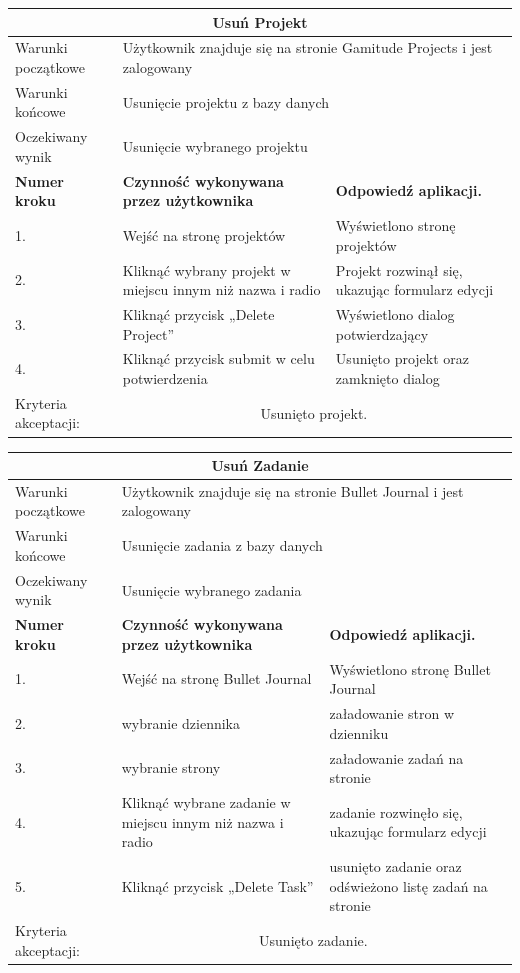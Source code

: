 \documentclass[a4paper,11pt]{report}
\begin{document}
\begin{table}[H]
	\centering
	\begin{tabular}{|p{2cm}|p{6cm}|p{6cm}|}
	\hline
	\multicolumn{3}{|c|}{\textbf{Usuń Projekt}}\\
	\hline
	Warunki początkowe & \multicolumn{2}{|p{12cm}|}{Użytkownik znajduje się na stronie Gamitude Projects i jest zalogowany}\\
	\hline
	Warunki końcowe & \multicolumn{2}{|p{12cm}|}{Usunięcie projektu z bazy danych}\\
	\hline
	Oczekiwany wynik & \multicolumn{2}{|p{12cm}|}{Usunięcie wybranego projektu}\\
	\hline
	\textbf{Numer kroku} & \textbf{Czynność wykonywana przez użytkownika} & \textbf{Odpowiedź aplikacji.} \\
	\hline
	1. & Wejść na stronę projektów & Wyświetlono stronę projektów \\
	\hline
	2. & Kliknąć wybrany projekt w miejscu innym niż nazwa i radio & Projekt rozwinął się, ukazując formularz edycji \\
	\hline
	3. & Kliknąć przycisk „Delete Project” & Wyświetlono dialog potwierdzający \\
	\hline
	4. & Kliknąć przycisk submit w celu potwierdzenia & Usunięto projekt oraz zamknięto dialog \\
	\hline
	Kryteria akceptacji: & \multicolumn{2}{|c|}{Usunięto projekt.} \\
	\hline
	\end{tabular}
\end{table}
\begin{table}[H]
	\centering
	\begin{tabular}{|p{2cm}|p{6cm}|p{6cm}|}
	\hline
	\multicolumn{3}{|c|}{\textbf{Usuń Zadanie}}\\
	\hline
	Warunki początkowe & \multicolumn{2}{|p{12cm}|}{Użytkownik znajduje się na stronie Bullet Journal i jest zalogowany}\\
	\hline
	Warunki końcowe & \multicolumn{2}{|p{12cm}|}{Usunięcie zadania z bazy danych}\\
	\hline
	Oczekiwany wynik & \multicolumn{2}{|p{12cm}|}{Usunięcie wybranego zadania}\\
	\hline
	\textbf{Numer kroku} & \textbf{Czynność wykonywana przez użytkownika} & \textbf{Odpowiedź aplikacji.} \\
	\hline
	1. & Wejść na stronę Bullet Journal & Wyświetlono stronę Bullet Journal\\
	\hline
	2. & wybranie dziennika & załadowanie stron w dzienniku \\
	\hline
	3. & wybranie strony & załadowanie zadań na stronie \\
	\hline
	4. & Kliknąć wybrane zadanie w miejscu innym niż nazwa i radio & zadanie rozwinęło się, ukazując formularz edycji \\
	\hline
	5. & Kliknąć przycisk „Delete Task” & usunięto zadanie oraz odświeżono listę zadań na stronie \\
	\hline
	Kryteria akceptacji: & \multicolumn{2}{|c|}{Usunięto zadanie.} \\
	\hline
	\end{tabular}
\end{table}
\end{document}
